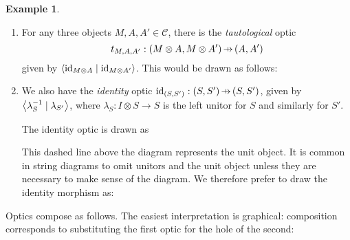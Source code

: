 \documentclass[11pt,letterpaper]{article}
\theoremstyle{plain}
\theoremstyle{definition}
\newtheorem{example}[theorem]{Example}
\newcommand{\C}{\mathscr{C}}
\newcommand{\id}{\mathrm{id}}
\newcommand{\rep}[2]{{\ensuremath \left\langle #1 \mid #2 \right\rangle}}
\newcommand{\hto}{\ensuremath{\,\mathaccent\shortmid\rightarrow\,}}
\begin{document}
  \begin{example}
  ~\begin{enumerate}[(1)]
  \item  For any three objects $M, A, A' \in \C$, there is the \emph{tautological} optic \[t_{M,A,A'} : (M \otimes A, M \otimes A') \hto (A, A')\] given by $\rep{\id_{M \otimes A}}{\id_{M \otimes A'}}$.
  This would be drawn as follows:
  \begin{center}
  
  \end{center}
  
  \item We also have the \emph{identity} optic $\id_{(S, S')} : (S, S') \hto (S, S')$, given by $\rep{\lambda^{-1}_S}{\lambda_{S'}}$, where $\lambda_S : I \otimes S \to S$ is the left unitor for $S$ and similarly for $S'$.

The identity optic is drawn as
\begin{center}
  
\end{center}
This dashed line above the diagram represents the unit object. It is common in string diagrams to omit unitors and the unit object unless they are necessary to make sense of the diagram. We therefore prefer to draw the identity morphism as:
\begin{center}
  
\end{center}
  \end{enumerate}
\end{example}

Optics compose as follows. The easiest interpretation is graphical: composition corresponds to substituting the first optic for the hole of the second:
\begin{center}
  
  \hspace{0.9cm} \raisebox{1.5cm}{$\circ$} \hspace{1cm}
   \\
  \raisebox{1.5cm}{$:=$}\qquad
  
\end{center}
\end{document}
